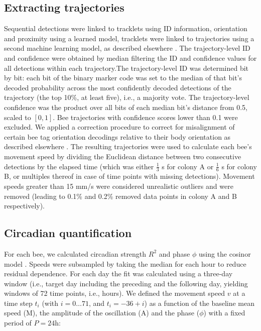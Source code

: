 \documentclass{article}
\newcommand{\added}[1]{{\color{blue}#1}}
\newcommand{\deleted}[1]{{\color{red}#1}} %
\newcommand{\replaced}[2]{\deleted{#1}\added{#2}}
\newcommand{\added}[1]{#1}
\newcommand{\deleted}[1]{}
\newcommand{\replaced}[2]{#2}
\begin{document}
\subsection*{Extracting trajectories}
Sequential detections were linked to tracklets using ID information, orientation and proximity using a learned model, tracklets were linked to trajectories using a second machine learning model, as described elsewhere \cite{boenisch_tracking_2018}. \replaced{The trajectory-level ID and confidence were obtained by median filtering the ID and confidence values for all detections within each trajectory.}{The trajectory-level ID was determined bit by bit: each bit of the binary marker code was set to the median of that bit's decoded probability across the most confidently decoded detections of the trajectory (the top 10\%, at least five), i.e., a majority vote. The trajectory-level confidence was the product over all bits of each median bit's distance from 0.5, scaled to $[0, 1]$.} Bee trajectories with confidence scores lower than 0.1 were excluded. We applied a correction procedure to correct for misalignment of certain bee tag orientation decodings relative to their body orientation as described elsewhere \cite{dormagen_machine_2023}. The resulting trajectories were used to calculate each bee’s movement speed by dividing the Euclidean distance between two consecutive detections by the elapsed time (which was either $\frac{1}{3}$ s for colony A or $\frac{1}{6}$ s for colony B, or multiples thereof in case of time points with missing detections). Movement speeds greater than 15 mm/s were considered unrealistic outliers and were removed (leading to 0.1\% and 0.2\% removed data points in colony A and B respectively).

\subsection*{Circadian quantification}
For each bee, we calculated circadian strength $R^2$ and phase $\phi$ using the cosinor model \cite{halberg_chronobiology_1969, nelson_methods_1979, bingham_inferential_1982}. Speeds were subsampled by taking the median for each hour to reduce residual dependence. For each day the fit was calculated using a three-day window (i.e., target day including the preceding and the following day, yielding windows of 72 time points, i.e., hours). We defined the movement speed $v$ at a time step $t_i$ (with $i = 0 \ldots 71$, and $t_i = -36 + i$) as a function of the baseline mean speed (M), the amplitude of the oscillation (A) and the phase ($\phi$) with a fixed period of $P = 24$h:
\end{document}
